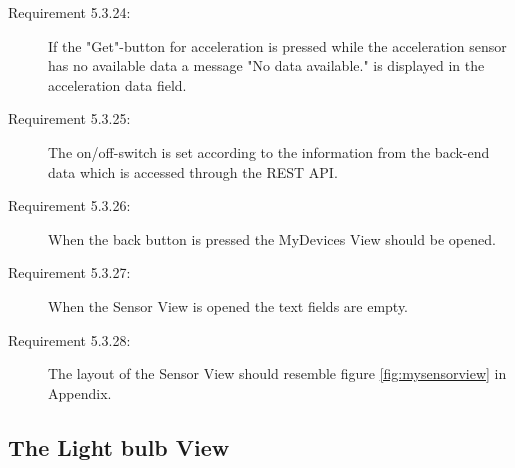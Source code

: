 \documentclass[a4paper]{article}
\begin{document}
\begin{description}
\item[Requirement 5.3.24:] If the "Get"-button for acceleration is pressed while the acceleration sensor has no available data a message "No data available." is displayed in the acceleration data field.

\item[Requirement 5.3.25:] The on/off-switch is set according to the information from the back-end data which is accessed through the REST API.

\item[Requirement 5.3.26:] When the back button is pressed the MyDevices View should be opened.

\item[Requirement 5.3.27:] When the Sensor View is opened the text fields are empty.

\item[Requirement 5.3.28:] The layout of the Sensor View should resemble figure \ref{fig:mysensorview} in Appendix.

\end{description}


\subsection{The Light bulb View}
\end{document}
